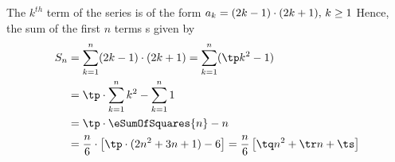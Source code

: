 \watchout
{}

\ifprintanswers
\fi 

\begin{solution}[\halfpage]
	The $k^{th}$ term of the series is of the form $a_k = (2 k-1)\cdot(2 k+1),\, k \geq 1$
	Hence, the sum of the first $n$ terms s given by
	\begin{align}
		S_n &= \sum_{k=1}^{n}(\vbone k-1)\cdot(\vbone k+1) = \sum_{k=1}^{n}(\tp k^2-1) \\
		&= \tp\cdot\sum_{k=1}^{n}k^2 - \sum_{k=1}^{n}1 \\
		&= \tp\cdot\eSumOfSquares{n} - n \\
		&= \dfrac{n}{6}\cdot\left[\tp\cdot(2n^2 + 3n + 1) - 6\right] = \dfrac{n}{6}\left[ \tq n^2 + \tr n + \ts \right] 
	\end{align}
\end{solution}
